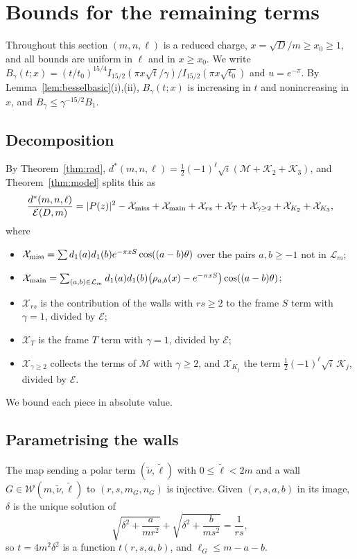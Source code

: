 \section{Bounds for the remaining terms}\label{sec:errors}

Throughout this section $(m,n,\ell)$ is a reduced charge, $x=\sqrt D/m\ge x_0\ge1$, and all bounds are uniform in $\ell$ and in $x\ge x_0$. We write $B_\gamma(t;x)=(t/t_0)^{15/4}I_{15/2}(\pi x\sqrt t/\gamma)/I_{15/2}(\pi x\sqrt{t_0})$ and $u=e^{-\pi}$. By Lemma~\ref{lem:besselbasic}(i),(ii), $B_\gamma(t;x)$ is increasing in $t$ and nonincreasing in $x$, and $B_\gamma\le\gamma^{-15/2}B_1$.

\subsection{Decomposition}
By Theorem~\ref{thm:rad}, $d^*(m,n,\ell)=\frac12(-1)^\ell\sqrt i(\mathcal M+\mathcal K_2+\mathcal K_3)$, and Theorem~\ref{thm:model} splits this as
\begin{equation}\label{eq:decomp}
\frac{d^*(m,n,\ell)}{\mathcal E(D,m)}=|P(z)|^2-\mathcal X_{\rm miss}+\mathcal X_{\rm main}+\mathcal X_{rs}+\mathcal X_{T}+\mathcal X_{\gamma\ge2}+\mathcal X_{K_2}+\mathcal X_{K_3},
\end{equation}
where
\begin{itemize}
\item $\mathcal X_{\rm miss}=\sum d_1(a)d_1(b)e^{-\pi xS}\cos((a-b)\theta)$ over the pairs $a,b\ge-1$ not in $\mathcal L_m$;
\item $\mathcal X_{\rm main}=\sum_{(a,b)\in\mathcal L_m}d_1(a)d_1(b)\big(\rho_{a,b}(x)-e^{-\pi xS}\big)\cos((a-b)\theta)$;
\item $\mathcal X_{rs}$ is the contribution of the walls with $rs\ge2$ to the frame $S$ term with $\gamma=1$, divided by $\mathcal E$;
\item $\mathcal X_T$ is the frame $T$ term with $\gamma=1$, divided by $\mathcal E$;
\item $\mathcal X_{\gamma\ge2}$ collects the terms of $\mathcal M$ with $\gamma\ge2$, and $\mathcal X_{K_j}$ the term $\frac12(-1)^\ell\sqrt i\,\mathcal K_j$, divided by $\mathcal E$.
\end{itemize}
We bound each piece in absolute value.

\subsection{Parametrising the walls}
\begin{lemma}\label{lem:wallparam}
The map sending a polar term $(\tilde\nu,\tilde\ell)$ with $0\le\tilde\ell<2m$ and a wall $G\in\mathcal W(m,\tilde\nu,\tilde\ell)$ to $(r,s,m_G,n_G)$ is injective. Given $(r,s,a,b)$ in its image, $\delta$ is the unique solution of
\begin{equation}\label{eq:deltaeq}
\sqrt{\delta^2+\frac a{mr^2}}+\sqrt{\delta^2+\frac b{ms^2}}=\frac1{rs},
\end{equation}
so $t=4m^2\delta^2$ is a function $t(r,s,a,b)$, and $\ell_G\le m-a-b$.
\end{lemma}

